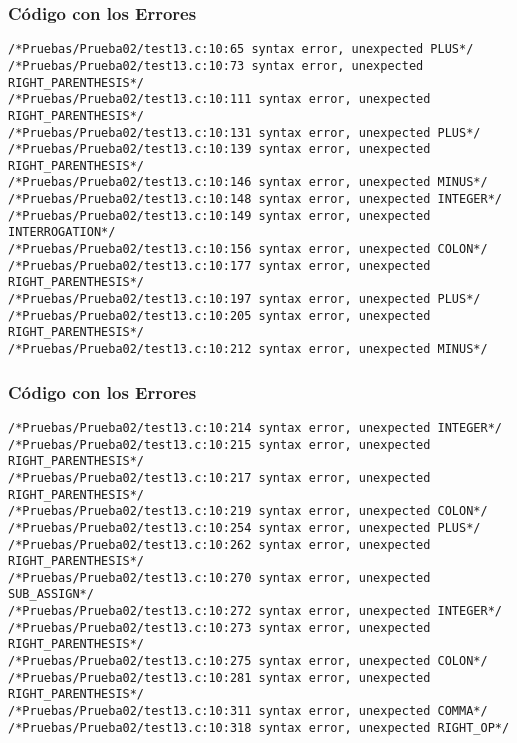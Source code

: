 \documentclass{beamer}
\begin{document}
\begin{frame}[fragile]
\frametitle{C\'odigo con los Errores}
\begin{verbatim}
/*Pruebas/Prueba02/test13.c:10:65 syntax error, unexpected PLUS*/
/*Pruebas/Prueba02/test13.c:10:73 syntax error, unexpected RIGHT_PARENTHESIS*/
/*Pruebas/Prueba02/test13.c:10:111 syntax error, unexpected RIGHT_PARENTHESIS*/
/*Pruebas/Prueba02/test13.c:10:131 syntax error, unexpected PLUS*/
/*Pruebas/Prueba02/test13.c:10:139 syntax error, unexpected RIGHT_PARENTHESIS*/
/*Pruebas/Prueba02/test13.c:10:146 syntax error, unexpected MINUS*/
/*Pruebas/Prueba02/test13.c:10:148 syntax error, unexpected INTEGER*/
/*Pruebas/Prueba02/test13.c:10:149 syntax error, unexpected INTERROGATION*/
/*Pruebas/Prueba02/test13.c:10:156 syntax error, unexpected COLON*/
/*Pruebas/Prueba02/test13.c:10:177 syntax error, unexpected RIGHT_PARENTHESIS*/
/*Pruebas/Prueba02/test13.c:10:197 syntax error, unexpected PLUS*/
/*Pruebas/Prueba02/test13.c:10:205 syntax error, unexpected RIGHT_PARENTHESIS*/
/*Pruebas/Prueba02/test13.c:10:212 syntax error, unexpected MINUS*/
\end{verbatim}
\end{frame}
\begin{frame}[fragile]
\frametitle{C\'odigo con los Errores}
\begin{verbatim}
/*Pruebas/Prueba02/test13.c:10:214 syntax error, unexpected INTEGER*/
/*Pruebas/Prueba02/test13.c:10:215 syntax error, unexpected RIGHT_PARENTHESIS*/
/*Pruebas/Prueba02/test13.c:10:217 syntax error, unexpected RIGHT_PARENTHESIS*/
/*Pruebas/Prueba02/test13.c:10:219 syntax error, unexpected COLON*/
/*Pruebas/Prueba02/test13.c:10:254 syntax error, unexpected PLUS*/
/*Pruebas/Prueba02/test13.c:10:262 syntax error, unexpected RIGHT_PARENTHESIS*/
/*Pruebas/Prueba02/test13.c:10:270 syntax error, unexpected SUB_ASSIGN*/
/*Pruebas/Prueba02/test13.c:10:272 syntax error, unexpected INTEGER*/
/*Pruebas/Prueba02/test13.c:10:273 syntax error, unexpected RIGHT_PARENTHESIS*/
/*Pruebas/Prueba02/test13.c:10:275 syntax error, unexpected COLON*/
/*Pruebas/Prueba02/test13.c:10:281 syntax error, unexpected RIGHT_PARENTHESIS*/
/*Pruebas/Prueba02/test13.c:10:311 syntax error, unexpected COMMA*/
/*Pruebas/Prueba02/test13.c:10:318 syntax error, unexpected RIGHT_OP*/
\end{verbatim}
\end{frame}
\end{document}
